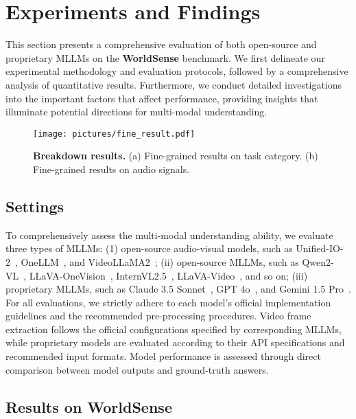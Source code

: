 \section{Experiments and Findings}
This section presents a comprehensive evaluation of both open-source and proprietary MLLMs on the \textbf{WorldSense} benchmark. We first delineate our experimental methodology and evaluation protocols, followed by a comprehensive analysis of quantitative results. Furthermore, we conduct detailed investigations into the important factors that affect performance, providing insights that illuminate potential directions for multi-modal understanding.

\begin{figure}
  \centering
  \texttt{[image: pictures/fine\_result.pdf]}
  \caption{\textbf{Breakdown results.} (a) Fine-grained results on task category. (b) Fine-grained results on audio signals.}
  \label{fig:breakdown_result}
  \vspace{-6mm}
\end{figure}



\subsection{Settings}
To comprehensively assess the multi-modal understanding ability, 
we evaluate three types of MLLMs: (1) open-source audio-visual models, 
such as Unified-IO-2~\cite{lu2024unified}, OneLLM~\cite{han2024onellm}, and VideoLLaMA2~\cite{cheng2024videollama}; 
(ii) open-source MLLMs, such as Qwen2-VL~\cite{Qwen2VL}, LLaVA-OneVision~\cite{li2024llava}, InternVL2.5~\cite{chen2024expanding}, LLaVA-Video~\cite{zhang2024video}, and so on; 
(iii) proprietary MLLMs, such as Claude 3.5 Sonnet~\cite{claude}, GPT 4o~\cite{hurst2024gpt}, and Gemini 1.5 Pro~\cite{team2024gemini}. 
For all evaluations, we strictly adhere to each model's official implementation guidelines and the recommended pre-processing procedures. 
Video frame extraction follows the official configurations specified by corresponding MLLMs, while proprietary models are evaluated according to their API specifications and recommended input formats. Model performance is assessed through direct comparison between model outputs and ground-truth answers.





\subsection{Results on WorldSense}

